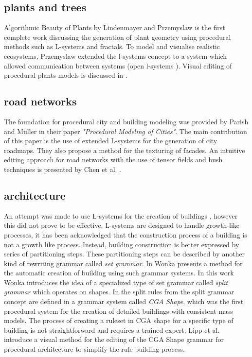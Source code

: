 \documentclass{article}
\begin{document}
\subsection{plants and trees}
Algorithmic Beauty of Plants by Lindenmayer and Przemyslaw \cite{PrzemyslawAlgoBeauty} is the first complete work discussing the generation of plant geometry using procedural methods such as L-systems and fractals. To model and visualise realistic ecosystems, Przemyslaw extended the l-systems concept to a system which allowed communication between systems (open l-systems \cite{PrzemyslawPlants} \cite{Deussen98}). Visual editing of procedural plants models is discussed in \cite{interactivebonsai}. 

\subsection{road networks}
The foundation for procedural city and building modeling was provided by Parish and Muller \cite{Parish01} in their paper \emph{"Procedural Modeling of Cities"}. The main contribution of this paper is the use of extended L-systems for the generation of city roadmaps. They also propose a method for the texturing of facades. An intuitive editing approach for road networks with the use of tensor fields and bush techniques is presented by Chen et al. \cite{Chen08}. 

\subsection{architecture}
An attempt was made to use L-systems for the creation of buildings \cite{Parish01}, however this did not prove to be effective. L-systems are designed to handle growth-like processes, it has been acknowledged that the construction process of a building is not a growth like process. Instead, building construction is better expressed by series of partitioning steps. These partitioning steps can be described by another kind of rewriting grammar called \emph{set grammar}. In \cite{Wonka03} Wonka presents a method for the automatic creation of building using such grammar systems. In this work Wonka introduces the idea of a specialized type of set grammar called \emph{split grammar} which operates on shapes. In \cite{Muller06} the split rules from the split grammar concept are defined in a grammar system called \emph{CGA Shape}, which was the first procedural system for the creation of detailed buildings with consistent mass 
models. The process of creating a ruleset in CGA shape for a specific type of building is not straightforward and requires a trained expert. Lipp et al. \cite{Lipp08} introduce a visual method for the editing of the CGA Shape grammar for procedural architecture to simplify the rule building process. 
\end{document}
